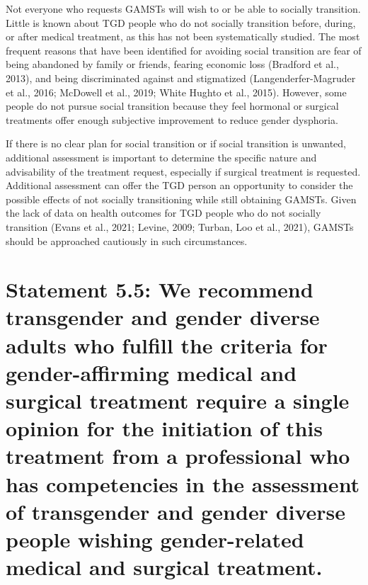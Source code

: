 \documentclass[
]{book}
\begin{document}
Not everyone who requests GAMSTs will wish
to or be able to socially transition. Little is known
about TGD people who do not socially transition
before, during, or after medical treatment, as this
has not been systematically studied. The most
frequent reasons that have been identified for
avoiding social transition are fear of being abandoned by family or friends, fearing economic loss
(Bradford et al., 2013), and being discriminated
against and stigmatized (Langenderfer-Magruder
et al., 2016; McDowell et al., 2019; White Hughto
et al., 2015). However, some people do not pursue
social transition because they feel hormonal or
surgical treatments offer enough subjective
improvement to reduce gender dysphoria.

If there is no clear plan for social transition
or if social transition is unwanted, additional
assessment is important to determine the specific
nature and advisability of the treatment request,
especially if surgical treatment is requested.
Additional assessment can offer the TGD person
an opportunity to consider the possible effects
of not socially transitioning while still obtaining
GAMSTs. Given the lack of data on health outcomes for TGD people who do not socially transition (Evans et al., 2021; Levine, 2009; Turban,
Loo et al., 2021), GAMSTs should be approached
cautiously in such circumstances.

\hypertarget{statement-5.5-we-recommend-transgender-and-gender-diverse-adults-who-fulfill-the-criteria-for-gender-affirming-medical-and-surgical-treatment-require-a-single-opinion-for-the-initiation-of-this-treatment-from-a-professional-who-has-competencies-in-the-assessment-of-transgender-and-gender-diverse-people-wishing-gender-related-medical-and-surgical-treatment.}{%
\section*{Statement 5.5: We recommend transgender and gender diverse adults who fulfill the criteria for gender-affirming medical and surgical treatment require a single opinion for the initiation of this treatment from a professional who has competencies in the assessment of transgender and gender diverse people wishing gender-related medical and surgical treatment.}\label{statement-5.5-we-recommend-transgender-and-gender-diverse-adults-who-fulfill-the-criteria-for-gender-affirming-medical-and-surgical-treatment-require-a-single-opinion-for-the-initiation-of-this-treatment-from-a-professional-who-has-competencies-in-the-assessment-of-transgender-and-gender-diverse-people-wishing-gender-related-medical-and-surgical-treatment.}}
\end{document}
